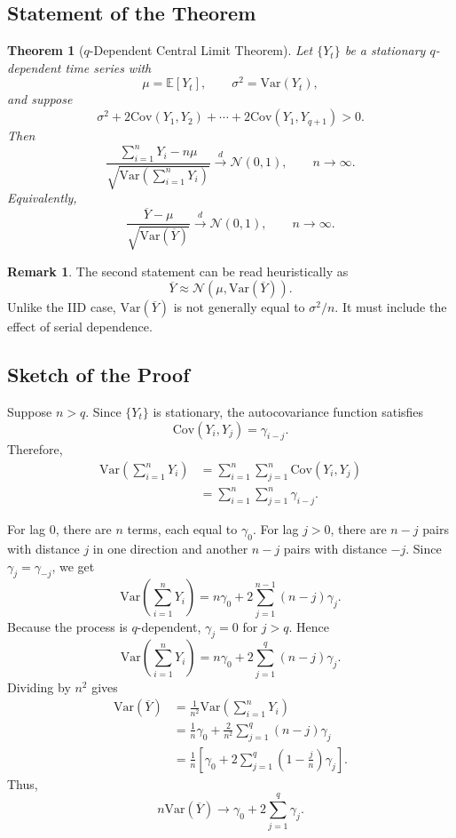 \documentclass[12pt,oneside]{book}
\numberwithin{equation}{section}
\theoremstyle{definition}
\newtheorem{remark}{Remark}[section]
\theoremstyle{plain}
\newtheorem{theorem}{Theorem}[section]
\theoremstyle{remark}
\newcommand{\E}{\mathbb{E}}
\newcommand{\Var}{\mathrm{Var}}
\newcommand{\Cov}{\mathrm{Cov}}
\newcommand{\convd}{\overset{d}{\to}}
\newcommand{\Normal}{\mathcal{N}}
\begin{document}
\subsection{Statement of the Theorem}

\begin{theorem}[$q$-Dependent Central Limit Theorem]
Let $\{Y_t\}$ be a stationary $q$-dependent time series with
\[
\mu=\E[Y_t],
\qquad
\sigma^2=\Var(Y_t),
\]
and suppose
\[
\sigma^2+2\Cov(Y_1,Y_2)+\cdots+2\Cov(Y_1,Y_{q+1})>0.
\]
Then
\[
\frac{\sum_{i=1}^n Y_i-n\mu}
{\sqrt{\Var\left(\sum_{i=1}^nY_i\right)}}
\convd
\Normal(0,1),
\qquad
n\to\infty.
\]
Equivalently,
\[
\frac{\overline{Y}-\mu}{\sqrt{\Var(\overline{Y})}}
\convd
\Normal(0,1),
\qquad
n\to\infty.
\]
\end{theorem}

\begin{remark}
The second statement can be read heuristically as
\[
\overline{Y}\approx \Normal(\mu,\Var(\overline{Y})).
\]
Unlike the IID case, $\Var(\overline{Y})$ is not generally equal to $\sigma^2/n$. It must include the effect of serial dependence.
\end{remark}

\subsection{Sketch of the Proof}

Suppose $n>q$. Since $\{Y_t\}$ is stationary, the autocovariance function satisfies
\[
\Cov(Y_i,Y_j)=\gamma_{i-j}.
\]
Therefore,
\begin{align*}
\Var\left(\sum_{i=1}^nY_i\right)
&=
\sum_{i=1}^n\sum_{j=1}^n \Cov(Y_i,Y_j) \\
&=
\sum_{i=1}^n\sum_{j=1}^n \gamma_{i-j}.
\end{align*}

For lag $0$, there are $n$ terms, each equal to $\gamma_0$. For lag $j>0$, there are $n-j$ pairs with distance $j$ in one direction and another $n-j$ pairs with distance $-j$. Since $\gamma_j=\gamma_{-j}$, we get
\[
\Var\left(\sum_{i=1}^nY_i\right)
=
n\gamma_0+2\sum_{j=1}^{n-1}(n-j)\gamma_j.
\]
Because the process is $q$-dependent, $\gamma_j=0$ for $j>q$. Hence
\[
\Var\left(\sum_{i=1}^nY_i\right)
=
n\gamma_0+2\sum_{j=1}^{q}(n-j)\gamma_j.
\]
Dividing by $n^2$ gives
\begin{align*}
\Var(\overline{Y})
&=
\frac{1}{n^2}\Var\left(\sum_{i=1}^nY_i\right) \\
&=
\frac{1}{n}\gamma_0
+
\frac{2}{n^2}\sum_{j=1}^{q}(n-j)\gamma_j \\
&=
\frac{1}{n}
\left[
\gamma_0+2\sum_{j=1}^{q}\left(1-\frac{j}{n}\right)\gamma_j
\right].
\end{align*}
Thus,
\[
n\Var(\overline{Y})
\to
\gamma_0+2\sum_{j=1}^{q}\gamma_j.
\]
\end{document}
